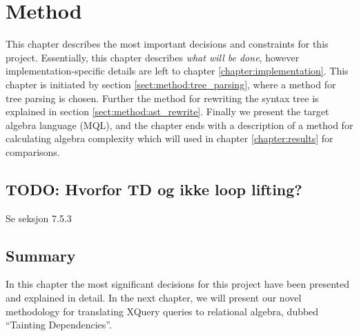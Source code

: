 \chapter{Method}
\label{chapter:method}
This chapter describes the most important decisions and constraints for this
project. Essentially, this chapter describes \emph{what will be done}, however
implementation-specific details are left to chapter
\ref{chapter:implementation}. This chapter is initiated by section
\ref{sect:method:tree_parsing}, where a method for tree parsing is chosen.
Further the method for rewriting the syntax tree is explained in section
\ref{sect:method:ast_rewrite}. Finally we present the target algebra language
(MQL), and the chapter ends with a description of a method for calculating
algebra complexity which will used in chapter \ref{chapter:results} for
comparisons.

\section{TODO: Hvorfor TD og ikke loop lifting?}
Se seksjon 7.5.3







\section{Summary}
\label{sect:method:summary}
In this chapter the most significant decisions for this project have been
presented and explained in detail. In the next chapter, we will present our
novel methodology for translating XQuery queries to relational algebra, dubbed
``Tainting Dependencies''.
